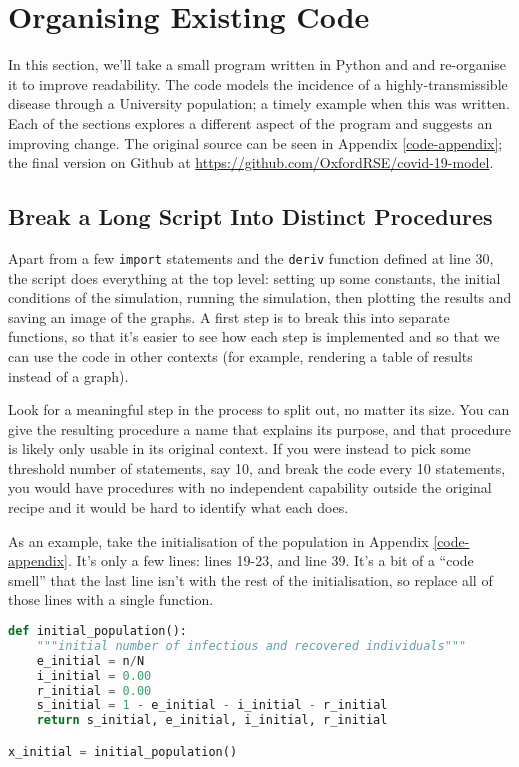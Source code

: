 \documentclass[a4paper]{article}
\begin{document}
\section{Organising Existing Code}

In this section, we'll take a small program written in Python and and re-organise it to improve readability.
The code models the incidence of a highly-transmissible disease through a University population; a timely example when this was written.
Each of the sections explores a different aspect of the program and suggests an improving change.
The original source can be seen in Appendix \ref{code-appendix}; the final version on Github at \url{https://github.com/OxfordRSE/covid-19-model}.

\subsection{Break a Long Script Into Distinct Procedures\label{breaklong}}

Apart from a few \texttt{import} statements and the \texttt{deriv} function defined at line 30, the script does everything at the top level: setting up some constants, the initial conditions of the simulation, running the simulation, then plotting the results and saving an image of the graphs.
A first step is to break this into separate functions, so that it's easier to see how each step is implemented and so that we can use the code in other contexts (for example, rendering a table of results instead of a graph).

Look for a meaningful step in the process to split out, no matter its size.
You can give the resulting procedure a name that explains its purpose, and that procedure is likely only usable in its original context.
If you were instead to pick some threshold number of statements, say 10, and break the code every 10 statements, you would have procedures with no independent capability outside the original recipe and it would be hard to identify what each does.

As an example, take the initialisation of the population in Appendix \ref{code-appendix}.
It's only a few lines: lines 19-23, and line 39.
It's a bit of a ``code smell'' that the last line isn't with the rest of the initialisation, so replace all of those lines with a single function.

\begin{lstlisting}[language=Python]
def initial_population():
    """initial number of infectious and recovered individuals"""
    e_initial = n/N
    i_initial = 0.00
    r_initial = 0.00
    s_initial = 1 - e_initial - i_initial - r_initial
    return s_initial, e_initial, i_initial, r_initial

x_initial = initial_population()
\end{lstlisting}
\end{document}
